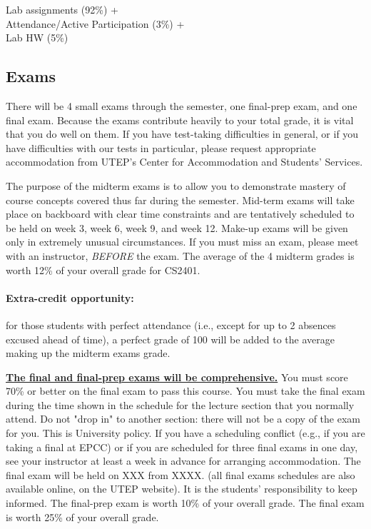 \documentclass[12pt]{scrartcl}
\newcommand{\change}[2]{#2}
\begin{document}
\begin{tcolorbox}[colback=blue!5,colframe=blue!75!black,title=Lab Grade]
\begin{center}

Lab assignments (92\%) + \\
Attendance/Active Participation (3\%) +\\
 Lab HW (5\%)
\end{center}

\end{tcolorbox}

\subsection{Exams}
There will be 4 small exams through the semester, one final-prep exam, and one final exam. 
Because the exams contribute heavily to your total grade, it is vital that you do well on them. 
If you have test-taking difficulties in general, or if you have difficulties with our tests in particular, please request appropriate accommodation from UTEP’s Center for Accommodation and Students’ Services.

The purpose of the midterm exams is to allow you to demonstrate mastery of course concepts covered thus far during the semester. 
Mid-term exams will take place \change{during the regular lecture sessions}{on backboard with clear time constraints} and are tentatively scheduled to be held on week 3, week 6, week 9, and week 12. 
Make-up exams will be given only in extremely unusual circumstances. 
If you must miss an exam, please meet with an instructor, \textit{BEFORE} the exam. 
The average of the 4 midterm grades is worth 12\% of your overall grade for CS2401.
 
\paragraph{Extra-credit opportunity:} 
for those students with perfect attendance (i.e., except for up to 2 absences excused ahead of time), a perfect grade of 100 will be added to the average making up the midterm exams grade.

\textbf{\underline{The final and final-prep exams will be comprehensive.}}
You must score 70\% or better on the final exam to pass this course. 
You must take the final exam during the time shown in the schedule for the lecture section that you normally attend. 
Do not "drop in" to another section: there will not be a copy of the exam for you. 
This is University policy. If you have a scheduling conflict (e.g., if you are taking a final at EPCC) or if you are scheduled for three final exams in one day, see your instructor at least a week in advance for arranging accommodation.
 The final exam will be held on {\color{red}XXX from XXXX}. (all final exams schedules are also available online, on the UTEP website). 
 It is the students’ responsibility to keep informed.  The final-prep exam is worth 10\% of your overall grade. The final exam is worth 25\% of your overall grade. 
\end{document}

